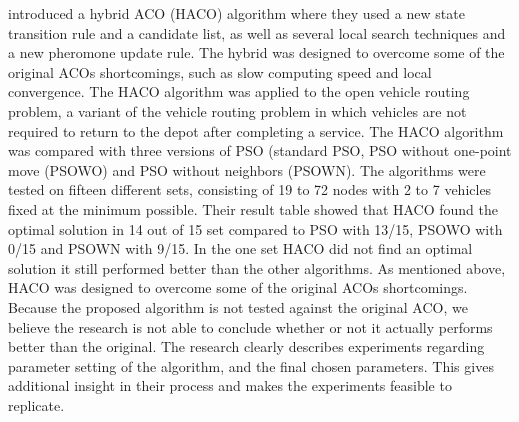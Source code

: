 \citet{sedighpour14} introduced a hybrid ACO (HACO) algorithm where they used a new state transition rule and a candidate list, as well as several local search techniques and a new pheromone update rule. The hybrid was designed to overcome some of the original ACOs shortcomings, such as slow computing speed and local convergence. The HACO algorithm was applied to the open vehicle routing problem, a variant of the vehicle routing problem in which vehicles are not required to return to the depot after completing a service. The HACO algorithm was compared with three versions of PSO (standard PSO, PSO without one-point move (PSOWO) and PSO without neighbors (PSOWN). The algorithms were tested on fifteen different sets, consisting of 19 to 72 nodes with 2 to 7 vehicles fixed at the minimum possible. Their result table showed that HACO found the optimal solution in 14 out of 15 set compared to PSO with 13/15, PSOWO with 0/15 and PSOWN with 9/15. In the one set HACO did not find an optimal solution it still performed better than the other algorithms. As mentioned above, HACO was designed to overcome some of the original ACOs shortcomings. Because the proposed algorithm is not tested against the original ACO, we believe the research is not able to conclude whether or not it actually performs better than the original. The research clearly describes experiments regarding parameter setting of the algorithm, and the final chosen parameters. This gives additional insight in their process and makes the experiments feasible to replicate. \newline

